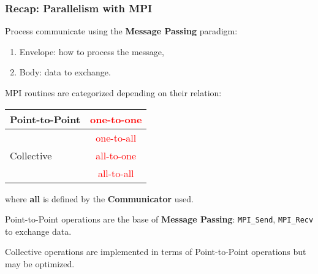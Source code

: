 \begin{frame}
  \frametitle{Recap: Parallelism with MPI}

Process communicate using the \textbf{Message Passing} paradigm:
\begin{enumerate}
\item Envelope: how to process the message,
\item Body: data to exchange. 
\end{enumerate}

\bigskip
MPI routines are categorized depending on their relation:
\begin{center}
\begin{tabular}{|l|c|}
\hline
Point-to-Point & \textcolor{red}{one-to-one}\\
\hline
\hfill & \textcolor{red}{one-to-all}\\
Collective & \textcolor{red}{all-to-one}\\
\hfill & \textcolor{red}{all-to-all}\\
\hline
\end{tabular}
\end{center}
where \textbf{all} is defined by the \textbf{Communicator} used.

\bigskip
Point-to-Point operations are the base of \textbf{Message Passing}: \texttt{MPI\_Send}, \texttt{MPI\_Recv} to exchange data.

\medskip
Collective operations are implemented in terms of Point-to-Point operations but may be optimized.

\end{frame}

